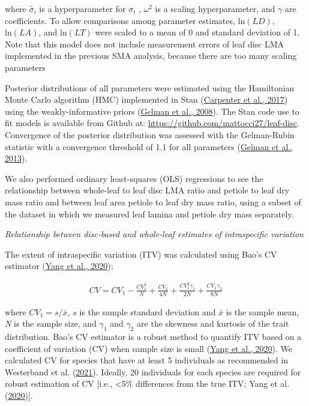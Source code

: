 \documentclass[
  12pt,
  a4paper,
,tablecaptionabove
]{scrartcl}
\begin{document}
where \(\tilde{\sigma_i}\) is a hyperparameter for \(\sigma_i\) ,
\(\omega^2\) is a scaling hyperparameter, and \(\gamma\) are coefficients.
To allow comparisons among parameter estimates, \(\mathrm{ln}(LD)\), \(\mathrm{ln}(LA)\), and \(\mathrm{ln}(LT)\) were scaled to a mean of 0 and standard deviation of 1.
Note that this model does not include measurement errors of leaf disc LMA implemented in the previous SMA analysis, because there are too many scaling parameters

Posterior distributions of all parameters were estimated using the Hamiltonian Monte Carlo algorithm (HMC) implemented in Stan (\protect\hyperlink{ref-Carpenter2017}{Carpenter et al., 2017}) using the weakly-informative priors (\protect\hyperlink{ref-Gelman2008}{Gelman et al., 2008}).
The Stan code use to fit models is available from Github at: \url{https://github.com/mattocci27/leaf-disc}.
Convergence of the posterior distribution was assessed with the Gelman-Rubin statistic with a convergence threshold of 1.1 for all parameters (\protect\hyperlink{ref-Gelman2013}{Gelman et al., 2013}).

We also performed ordinary least-squares (OLS) regressions to see the relationship between whole-leaf to leaf disc LMA ratio and petiole to leaf dry mass ratio and between leaf area petiole to leaf dry mass ratio, using a subset of the dataset in which we measured leaf lamina and petiole dry mass separately.

\emph{Relationship between disc-based and whole-leaf estimates of intraspecific variation}

The extent of intraspecific variation (ITV) was calculated using Bao's CV estimator (\protect\hyperlink{ref-Yang2020}{Yang et al., 2020});

\begin{align}
CV = CV_1 - \frac{CV_1^3}{N} + \frac{CV_1}{4N} + \frac{CV_1^2 \gamma_1}{2N} + \frac{CV_1 \gamma_2}{8N} \label{eq:CV}
\end{align}

where \(CV_1 = s/\bar{x}\), \(s\) is the sample standard deviation and \(\bar{x}\) is the sample mean, \emph{N} is the sample size, and \(\gamma_1\) and \(\gamma_2\) are the skewness and kurtosis of the trait distribution.
Bao's CV estimator is a robust method to quantify ITV based on a coefficient of variation (CV) when sample size is small (\protect\hyperlink{ref-Yang2020}{Yang et al., 2020}).
We calculated CV for species that have at least 5 individuals as recommended in Westerband et al. (\protect\hyperlink{ref-Westerband2021}{2021}).
Ideally, 20 individuals for each species are required for robust estimation of CV {[}i.e., \textless5\% differences from the true ITV; Yang et al. (\protect\hyperlink{ref-Yang2020}{2020}){]}.
\end{document}
